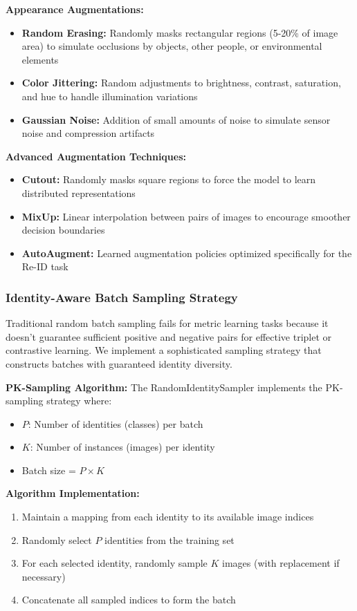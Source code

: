 \documentclass[a4paper,12pt]{article}
\begin{document}
\textbf{Appearance Augmentations:}
\begin{itemize}
    \item \textbf{Random Erasing:} Randomly masks rectangular regions (5-20\% of image area) to simulate occlusions by objects, other people, or environmental elements
    \item \textbf{Color Jittering:} Random adjustments to brightness, contrast, saturation, and hue to handle illumination variations
    \item \textbf{Gaussian Noise:} Addition of small amounts of noise to simulate sensor noise and compression artifacts
\end{itemize}

\textbf{Advanced Augmentation Techniques:}
\begin{itemize}
    \item \textbf{Cutout:} Randomly masks square regions to force the model to learn distributed representations
    \item \textbf{MixUp:} Linear interpolation between pairs of images to encourage smoother decision boundaries
    \item \textbf{AutoAugment:} Learned augmentation policies optimized specifically for the Re-ID task
\end{itemize}

\subsubsection{Identity-Aware Batch Sampling Strategy}

Traditional random batch sampling fails for metric learning tasks because it doesn't guarantee sufficient positive and negative pairs for effective triplet or contrastive learning. We implement a sophisticated sampling strategy that constructs batches with guaranteed identity diversity.

\textbf{PK-Sampling Algorithm:}
The RandomIdentitySampler implements the PK-sampling strategy where:
\begin{itemize}
    \item $P$: Number of identities (classes) per batch
    \item $K$: Number of instances (images) per identity
    \item Batch size = $P \times K$
\end{itemize}

\textbf{Algorithm Implementation:}
\begin{enumerate}
    \item Maintain a mapping from each identity to its available image indices
    \item Randomly select $P$ identities from the training set
    \item For each selected identity, randomly sample $K$ images (with replacement if necessary)
    \item Concatenate all sampled indices to form the batch
\end{enumerate}
\end{document}
